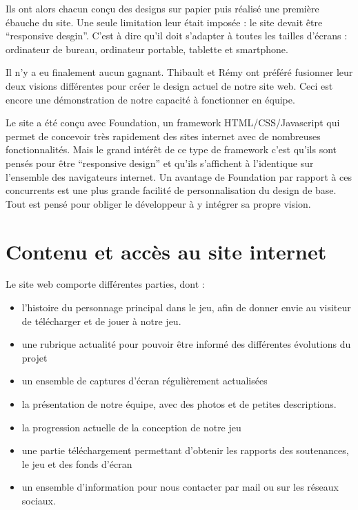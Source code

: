 \documentclass[11pt]{report}
\begin{document}
Ils ont alors chacun conçu des designs sur papier puis réalisé une première ébauche du site. Une seule limitation leur était imposée : le site devait être ``responsive desgin''. C'est à dire qu'il doit s'adapter à toutes les tailles d'écrans : ordinateur de bureau, ordinateur portable, tablette et smartphone.

Il n'y a eu finalement aucun gagnant. Thibault et Rémy ont préféré fusionner leur deux visions différentes pour créer le design actuel de notre site web. Ceci est encore une démonstration de notre capacité à fonctionner en équipe.

Le site a été conçu avec Foundation, un framework HTML/CSS/Javascript qui permet de concevoir très rapidement des sites internet avec de nombreuses fonctionnalités. Mais le grand intérêt de ce type de framework c'est qu'ils sont pensés pour être ``responsive design'' et qu'ils s'affichent à l'identique sur l'ensemble des navigateurs internet. Un avantage de Foundation par rapport à ces concurrents est une plus grande facilité de personnalisation du design de base. Tout est pensé pour obliger le développeur à y intégrer sa propre vision.

\section{Contenu et accès au site internet}

Le site web comporte différentes parties, dont :

\begin{itemize}
  \item l’histoire du personnage principal dans le jeu, afin de donner envie au visiteur de télécharger et de jouer à notre jeu.
  \item une rubrique actualité pour pouvoir être informé des différentes évolutions du projet
  \item un ensemble de captures d'écran régulièrement actualisées
  \item la présentation de notre équipe, avec des photos et de petites descriptions.
  \item la progression actuelle de la conception de notre jeu
  \item une partie téléchargement permettant d'obtenir les rapports des soutenances, le jeu et des fonds d'écran
  \item un ensemble d'information pour nous contacter par mail ou sur les réseaux sociaux.
\end{itemize}
\end{document}
